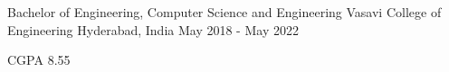 

\begin{cventries}

  \cventry
    {Bachelor of Engineering, Computer Science and Engineering} %
    {Vasavi College of Engineering} %
    {Hyderabad, India} %
    {May 2018 - May 2022} %
    {
      \begin{cvitems} %
        \item {CGPA 8.55} 
      \end{cvitems}
    }
\end{cventries}
